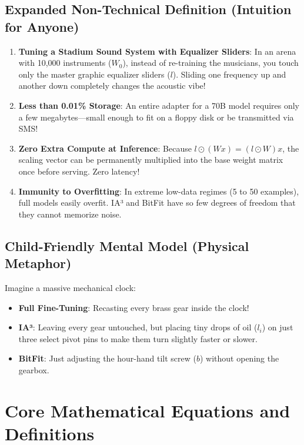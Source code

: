 \documentclass[11pt,a4paper]{article}
\theoremstyle{definition}
\begin{document}
\subsection{Expanded Non-Technical Definition (Intuition for Anyone)}
\begin{enumerate}
    \item \textbf{Tuning a Stadium Sound System with Equalizer Sliders}: In an arena with 10,000 instruments ($W_0$), instead of re-training the musicians, you touch only the master graphic equalizer sliders ($l$). Sliding one frequency up and another down completely changes the acoustic vibe!
    \item \textbf{Less than 0.01\% Storage}: An entire adapter for a 70B model requires only a few megabytes—small enough to fit on a floppy disk or be transmitted via SMS!
    \item \textbf{Zero Extra Compute at Inference}: Because $l \odot (W x) = (l \odot W) x$, the scaling vector can be permanently multiplied into the base weight matrix once before serving. Zero latency!
    \item \textbf{Immunity to Overfitting}: In extreme low-data regimes (5 to 50 examples), full models easily overfit. IA³ and BitFit have so few degrees of freedom that they cannot memorize noise.
\end{enumerate}

\subsection{Child-Friendly Mental Model (Physical Metaphor)}
Imagine a massive mechanical clock:
\begin{itemize}
    \item \textbf{Full Fine-Tuning}: Recasting every brass gear inside the clock!
    \item \textbf{IA³}: Leaving every gear untouched, but placing tiny drops of oil ($l_i$) on just three select pivot pins to make them turn slightly faster or slower.
    \item \textbf{BitFit}: Just adjusting the hour-hand tilt screw ($b$) without opening the gearbox.
\end{itemize}

\section{Core Mathematical Equations and Definitions}
\end{document}
